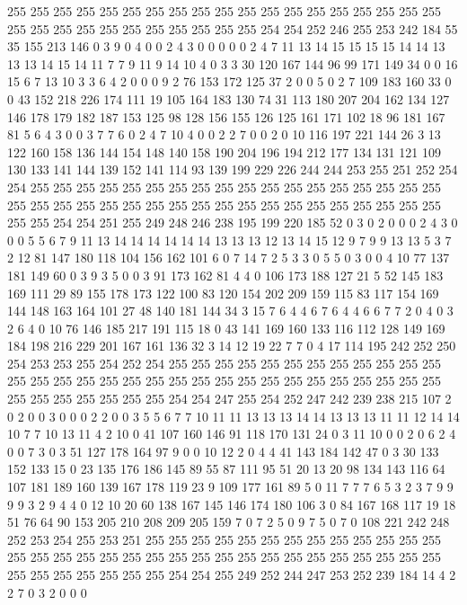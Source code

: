 255 255 255 255 255 255 255 255 255 255 255 255 255 255 255 255 255 255 255 255
255 255 255 255 255 255 255 255 255 255 254 254 252 246 255 253 242 184 55 35
155 213 146 0 3 9 0 4 0 0 2 4 3 0 0 0 0 0 2 4
7 11 13 14 15 15 15 15 14 14 13 13 13 14 15 14 11 7 7 9
11 9 14 10 4 0 3 3 30 120 167 144 96 99 171 149 34 0 0 16
15 6 7 13 10 3 3 6 4 2 0 0 0 9 2 76 153 172 125 37
2 0 0 5 0 2 7 109 183 160 33 0 0 43 152 218 226 174 111 19
105 164 183 130 74 31 113 180 207 204 162 134 127 146 178 179 182 187 153 125
98 128 156 155 126 125 161 171 102 18 96 181 167 81 5 6 4 3 0 0
3 7 7 6 0 2 4 7 10 4 0 0 2 2 7 0 0 2 0 10
116 197 221 144 26 3 13 122 160 158 136 144 154 148 140 158 190 204 196 194
212 177 134 131 121 109 130 133 141 144 139 152 141 114 93 139 199 229 226 244
244 253 255 251 252 254 254 255 255 255 255 255 255 255 255 255 255 255 255 255
255 255 255 255 255 255 255 255 255 255 255 255 255 255 255 255 255 255 255 255
255 255 255 255 255 255 254 254 251 255 249 248 246 238 195 199 220 185 52 0
3 0 2 0 0 0 2 4 3 0 0 0 5 5 6 7 9 11 13 14
14 14 14 14 14 13 13 13 12 13 14 15 12 9 7 9 9 13 13 5
3 7 2 12 81 147 180 118 104 156 162 101 6 0 7 14 7 2 5 3
3 0 5 5 0 3 0 0 4 10 77 137 181 149 60 0 3 9 3 5
0 0 3 91 173 162 81 4 4 0 106 173 188 127 21 5 52 145 183 169
111 29 89 155 178 173 122 100 83 120 154 202 209 159 115 83 117 154 169 144
148 163 164 101 27 48 140 181 144 34 3 15 7 6 4 4 6 7 6 4
4 6 6 7 7 2 0 4 0 3 2 6 4 0 10 76 146 185 217 191
115 18 0 43 141 169 160 133 116 112 128 149 169 184 198 216 229 201 167 161
136 32 3 14 12 19 22 7 7 0 4 17 114 195 242 252 250 254 253 253
255 254 252 254 255 255 255 255 255 255 255 255 255 255 255 255 255 255 255 255
255 255 255 255 255 255 255 255 255 255 255 255 255 255 255 255 255 255 255 255
255 255 254 254 247 255 254 252 247 242 239 238 215 107 2 0 2 0 0 3
0 0 0 2 2 0 0 3 5 5 6 7 7 10 11 11 13 13 13 14
14 13 13 13 11 11 12 14 14 10 7 7 10 13 11 4 2 10 0 41
107 160 146 91 118 170 131 24 0 3 11 10 0 0 2 0 6 2 4 0
0 7 3 0 3 51 127 178 164 97 9 0 0 10 12 2 0 4 4 41
143 184 142 47 0 3 30 133 152 133 15 0 23 135 176 186 145 89 55 87
111 95 51 20 13 20 98 134 143 116 64 107 181 189 160 139 167 178 119 23
9 109 177 161 89 5 0 11 7 7 7 6 5 3 2 3 7 9 9 9
9 3 2 9 4 4 0 12 10 20 60 138 167 145 146 174 180 106 3 0
84 167 168 117 19 18 51 76 64 90 153 205 210 208 209 205 159 7 0 7
2 5 0 9 7 5 0 7 0 108 221 242 248 252 253 254 255 253 251 255
255 255 255 255 255 255 255 255 255 255 255 255 255 255 255 255 255 255 255 255
255 255 255 255 255 255 255 255 255 255 255 255 255 255 255 255 255 255 254 254
255 249 252 244 247 253 252 239 184 14 4 2 2 7 0 3 2 0 0 0
